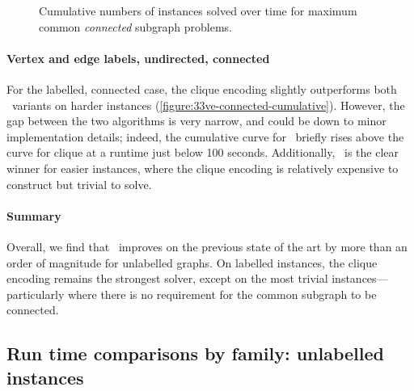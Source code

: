 \begin{figure}[h!]
    \centering
    \par\bigskip
    \caption{Cumulative numbers of instances solved over time for maximum
    common \emph{connected} subgraph problems.}\label{figure:mcs-cumulative-connected}
\end{figure}






\paragraph{Vertex and edge labels, undirected, connected} For the labelled,
connected case, the clique encoding slightly outperforms both \McSplit\
variants on harder instances (\cref{figure:33ve-connected-cumulative}).
However, the gap between the two algorithms is very narrow, and could be
down to minor implementation details; indeed, the cumulative curve for
\McSplit\ briefly rises above the curve for clique at a runtime just below 100
seconds. Additionally, \McSplit\ is the clear winner for easier instances,
where the clique encoding is relatively expensive to construct but trivial to
solve.






\paragraph{Summary} Overall, we find that \McSplit\ improves on the
previous state of the art by more than an order of magnitude for
unlabelled graphs.  On labelled instances, the clique encoding remains the
strongest solver, except on the most trivial instances---particularly where
there is no requirement for the common subgraph to be connected.





\FloatBarrier


\subsection{Run time comparisons by family: unlabelled instances}


